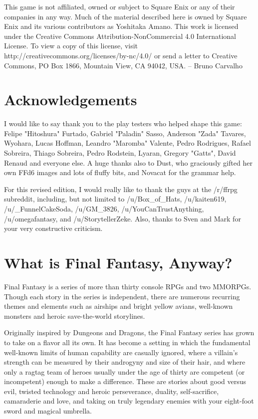 \begin{multicols}{2}
This game is not affiliated, owned or subject
to Square Enix or any of their companies in any
way. Much of the material described here is owned
by Square Enix and its various contributors as
Yoshitaka Amano. This work is licensed under the
Creative Commons Attribution-NonCommercial
4.0 International License. To view a copy of this
license, visit
http://creativecommons.org/licenses/by-nc/4.0/
or send a letter to Creative Commons, PO Box 1866,
Mountain View, CA 94042, USA.
– Bruno Carvalho
\end{multicols}
\newpage

\begin{multicols}{2}
\section*{Acknowledgements}
I would like to say thank you to the play
testers who helped shape this game: Felipe
"Hitoshura" Furtado, Gabriel "Paladin" Sasso,
Anderson "Zada" Tavares, Wyohara, Lucas
Hoffman, Leandro "Maromba" Valente, Pedro
Rodrigues, Rafael Sobreira, Thiago Sobreira, Pedro
Rodstein, Lyaran, Gregory "Gatts", David Renaud
and everyone else. A huge thanks also to Dust,
who graciously gifted her own FFd6 images and
lots of fluffy bits, and Novacat for the grammar
help.

For this revised edition, I would really like
to thank the guys at the /r/ffrpg subreddit,
including, but not limited to /u/Box\_of\_Hats,
/u/kaiten619, /u/\_FunnelCakeSoda, /u/GM\_3826,
/u/YouCanTrustAnything, /u/omegafantasy, and
/u/StorytellerZeke. Also, thanks to Sven and Mark
for your very constructive criticism.

\section*{What is Final Fantasy, Anyway?}
Final Fantasy is a series of more than thirty
console RPGs and two MMORPGs. Though each
story in the series is independent, there are
numerous recurring themes and elements such as
airships and bright yellow avians, well-known
monsters and heroic save-the-world storylines.

Originally inspired by Dungeons and
Dragons, the Final Fantasy series has grown to
take on a flavor all its own. It has become a setting
in which the fundamental well-known limits of
human capability are casually ignored, where a
villain’s strength can be measured by their
androgyny and size of their hair, and where only a
ragtag team of heroes usually under the age of
thirty are competent (or incompetent) enough to
make a difference. These are stories about good
versus evil, twisted technology and heroic
perseverance, duality, self-sacrifice, camaraderie
and love, and taking on truly legendary enemies
with your eight-foot sword and magical umbrella.
\end{multicols}